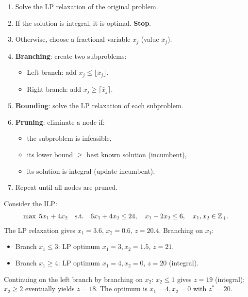 \begin{algorithme}[title=\textbf{Branch and Bound}]
\begin{enumerate}
  \item Solve the LP relaxation of the original problem.
  \item If the solution is integral, it is optimal. \textbf{Stop}.
  \item Otherwise, choose a fractional variable $x_j$ (value $\bar{x}_j$).
  \item \textbf{Branching}: create two subproblems:
    \begin{itemize}
      \item Left branch: add $x_j \leq \lfloor \bar{x}_j \rfloor$.
      \item Right branch: add $x_j \geq \lceil \bar{x}_j \rceil$.
    \end{itemize}
  \item \textbf{Bounding}: solve the LP relaxation of each subproblem.
  \item \textbf{Pruning}: eliminate a node if:
    \begin{itemize}
      \item the subproblem is infeasible,
      \item its lower bound $\geq$ best known solution (incumbent),
      \item its solution is integral (update incumbent).
    \end{itemize}
  \item Repeat until all nodes are pruned.
\end{enumerate}
\end{algorithme}

\begin{example}
Consider the ILP:
\[
  \max\; 5x_1 + 4x_2 \quad \text{s.t.} \quad
  6x_1 + 4x_2 \leq 24, \quad x_1 + 2x_2 \leq 6, \quad
  x_1, x_2 \in \mathbb{Z}_+.
\]
The LP relaxation gives $x_1 = 3.6$, $x_2 = 0.6$, $z = 20.4$.
Branching on $x_1$:
\begin{itemize}
  \item Branch $x_1 \leq 3$: LP optimum $x_1 = 3, x_2 = 1.5$, $z = 21$.
  \item Branch $x_1 \geq 4$: LP optimum $x_1 = 4, x_2 = 0$, $z = 20$
        (integral).
\end{itemize}
Continuing on the left branch by branching on $x_2$: $x_2 \leq 1$ gives
$z = 19$ (integral); $x_2 \geq 2$ eventually yields $z = 18$. The optimum
is $x_1 = 4, x_2 = 0$ with $z^* = 20$.
\end{example}

